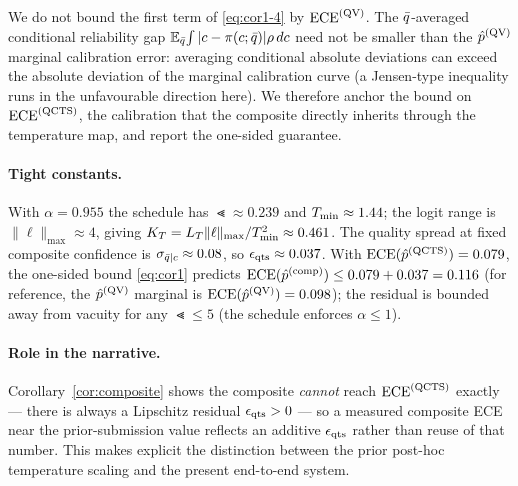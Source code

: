\begin{remark}\label{rem:cor1-onesided}
We do not bound the first term of \eqref{eq:cor1-4} by $\operatorname{ECE}^{(\mathrm{QV})}$. The
$\bar{q}$-averaged conditional reliability gap $\operatorname*{\mathbb{E}}_{\bar{q}}\!\int|c-\pi(c;\bar{q})|\rho\,dc$ need
not be smaller than the $\hat{p}^{(\mathrm{QV})}$ marginal calibration error: averaging conditional absolute
deviations can exceed the absolute deviation of the marginal calibration curve (a
Jensen-type inequality runs in the unfavourable direction here). We therefore anchor the bound
on $\operatorname{ECE}^{(\mathrm{QCTS})}$, the calibration that the composite directly inherits through the
temperature map, and report the one-sided guarantee. %
\end{remark}

\paragraph{Tight constants.}
With $\alpha=0.955$ the schedule has $\Lt\approx 0.239$ and $T_{\min}\approx 1.44$; the \qvib{}
logit range is $\|\ell\|_{\max}\approx 4$, giving $K_T=L_T\|\ell\|_{\max}/T_{\min}^2\approx 0.461$.
The quality spread at fixed composite confidence is $\sigma_{\bar{q}\mid c}\approx 0.08$, so
$\epsilon_{\mathrm{qts}}\approx 0.037$. With $\operatorname{ECE}(\hat{p}^{(\mathrm{QCTS})})=0.079$, the one-sided bound \eqref{eq:cor1} predicts
$\operatorname{ECE}(\hat{p}^{(\mathrm{comp})})\leq 0.079+0.037 = 0.116$ (for reference, the $\hat{p}^{(\mathrm{QV})}$ marginal is
$\operatorname{ECE}(\hat{p}^{(\mathrm{QV})})=0.098$); the residual is bounded away from vacuity for any $\Lt\leq 5$ (the schedule
enforces $\alpha\leq 1$).

\paragraph{Role in the narrative.}
Corollary~\ref{cor:composite} shows the composite \emph{cannot} reach $\operatorname{ECE}^{(\mathrm{QCTS})}$
exactly --- there is always a Lipschitz residual $\epsilon_{\mathrm{qts}}>0$ --- so a measured composite ECE
near the prior-submission value reflects an additive $\epsilon_{\mathrm{qts}}$ rather than reuse of that number.
This makes explicit the distinction between the prior post-hoc temperature scaling and the
present end-to-end system.
